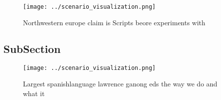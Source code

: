 \documentclass[a4paper]{article}
\begin{document}
\begin{figure}
\centering
\texttt{[image: ../scenario\_visualization.png]}
\caption{Northwestern europe claim is Scripts beore experiments with
}
\end{figure}
 
\subsection{SubSection}

\begin{figure}
\centering
\texttt{[image: ../scenario\_visualization.png]}
\caption{Largest spanishlanguage lawrence ganong eds the way we do and what it
}
\end{figure}
 
\end{document}
